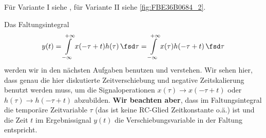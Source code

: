 \begin{Loesung}
Für Variante I siehe , für Variante II siehe
\ref{fig:FBE36B0684_2}.

Das Faltungsintegral
\begin{equation}
y(t)
= \int\limits_{-\infty}^{+\infty} x(-\tau+t) h(\tau) \, \fsd \tau
= \int\limits_{-\infty}^{+\infty} x(\tau) h(-\tau+t) \, \fsd \tau
\end{equation}
werden wir in den nächsten Aufgaben benutzen und verstehen.
%
Wir sehen hier, dass genau die hier
diskutierte Zeitverschiebung und negative Zeitskalierung benutzt werden muss, um
die Signaloperationen $x(\tau) \rightarrow x(-\tau+t)$
oder $h(\tau) \rightarrow h(-\tau+t)$ abzubilden.
\textbf{Wir beachten aber}, dass im Faltungsintegral die temporäre Zeitvariable
$\tau$ (das ist keine RC-Glied Zeitkonstante o.ä.) ist und die Zeit $t$
im Ergebnissignal $y(t)$ die Verschiebungsvariable in der Faltung entspricht.
\end{Loesung}

